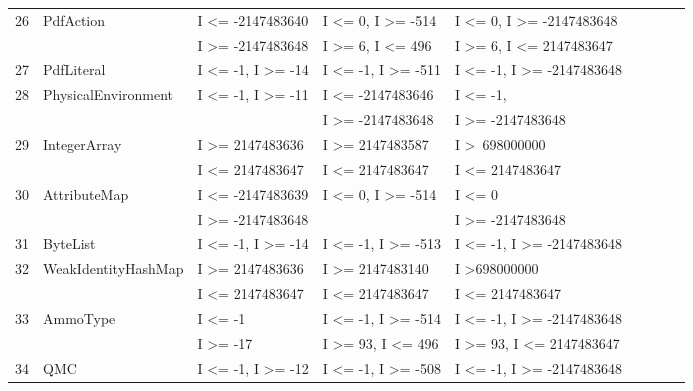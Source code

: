 {\begin{longtable}{|l|l|l|l|l|l|l|l|l|}
26	& PdfAction					& I \textless= -2147483640 					& I \textless= 0, I \textgreater= -514		& I \textless= 0, I \textgreater= -2147483648 	\\ 
	&                                             & I \textgreater= -2147483648				& I \textgreater= 6, I \textless= 496		& I \textgreater= 6,  I \textless= 2147483647	\\	
27	& PdfLiteral					& I \textless= -1, I \textgreater= -14			& I \textless= -1, I \textgreater= -511		& I \textless= -1, I \textgreater= -2147483648	\\ 
28	& PhysicalEnvironment		& I \textless= -1, I \textgreater= -11			& I \textless= -2147483646				& I \textless= -1, 							\\ 
	& 							& 											& I \textgreater= -2147483648 			& I \textgreater= -2147483648				\\ 
29	& IntegerArray				& I \textgreater= 2147483636				& I \textgreater= 2147483587			& I \textgreater~698000000					\\ 
	&                                             & I \textless= 2147483647					& I \textless= 2147483647				&  I \textless= 2147483647					\\	
30	& AttributeMap				& I \textless= -2147483639					& I \textless= 0, I \textgreater= -514		& I \textless= 0								\\ 
	&                                             & I \textgreater= -2147483648				& 										& I \textgreater= -2147483648 			   	\\	
31	& ByteList					& I \textless= -1, I \textgreater= -14			& I \textless= -1, I \textgreater= -513		& I \textless= -1, I \textgreater= -2147483648	\\ 
32	& WeakIdentityHashMap		& I \textgreater= 2147483636				& I \textgreater= 2147483140			& I \textgreater 698000000					\\ 
	&                                             & I \textless= 2147483647					& I \textless= 2147483647				& I \textless= 2147483647					\\
33	& AmmoType				& I \textless= -1								& I \textless= -1, I \textgreater= -514		& I \textless= -1, I \textgreater= -2147483648	\\ 			
	&                                             & I \textgreater= -17							& I \textgreater= 93, I \textless= 496		& I \textgreater= 93, 	I \textless= 2147483647	\\
34	& QMC						& I \textless= -1, I \textgreater= -12			& I \textless= -1, I \textgreater= -508		& I \textless= -1, I \textgreater= -2147483648	\\ 

\end{longtable}}
